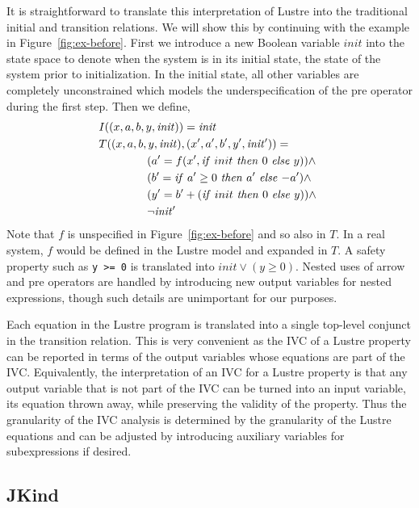 It is straightforward to translate this interpretation of Lustre into
the traditional initial and transition relations. We will show this by
continuing with the example in Figure~\ref{fig:ex-before}. First we
introduce a new Boolean variable $init$ into the state space to denote
when the system is in its initial state, the state of the system prior
to initialization. In the initial state, all other variables are
completely unconstrained which models the underspecification of the pre
operator during the first step. Then we define,
\begin{align*}
  &I((x, a, b, y, \mathit{init})) = \mathit{init} \\
  &T((x, a, b, y, \mathit{init}), (x', a', b', y', \mathit{init'})) = \\
  &\hspace{1.5cm} (a' = f(x', \mathit{if}\ {init}\ \mathit{then}\ {0}\ \mathit{else}\ {y})) \land~ \\
  &\hspace{1.5cm} (b' = \mathit{if}\ {a' \geq 0}\ \mathit{then}\ {a'}\ \mathit{else}\ {-a'}) \land~ \\
  &\hspace{1.5cm} (y' = b' + (\mathit{if}\ {init}\ \mathit{then}\ {0}\ \mathit{else}\ {y})) \land ~\\
  &\hspace{1.5cm} \neg\mathit{init'}
\end{align*}
Note that $f$ is unspecified in Figure~\ref{fig:ex-before} and so also
in $T$. In a real system, $f$ would be defined in the Lustre model and
expanded in $T$. A safety property such as {\tt y >= 0} is translated
into $\mathit{init} \lor (y \geq 0)$. Nested uses of arrow and pre
operators are handled by introducing new output variables for nested
expressions, though such details are unimportant for our purposes.

Each equation in the Lustre program is translated into a single
top-level conjunct in the transition relation. This is very convenient
as the IVC of a Lustre property can be reported in terms of the output
variables whose equations are part of the IVC. Equivalently, the
interpretation of an IVC for a Lustre property is that any output
variable that is not part of the IVC can be turned into an input
variable, its equation thrown away, while preserving the validity of
the property. Thus the granularity of the IVC analysis is determined
by the granularity of the Lustre equations and can be adjusted by
introducing auxiliary variables for subexpressions if desired.

\subsection{JKind}

